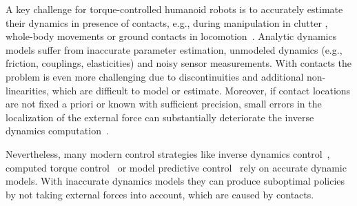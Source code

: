 
A key challenge for torque-controlled humanoid robots is to accurately
estimate their dynamics in presence of contacts, e.g.,
during manipulation in clutter
\cite{Jain2013clutter}, whole-body movements
\cite{Handbook2008legged} or ground contacts in locomotion~\cite{Calandra2014}.
Analytic dynamics models suffer from inaccurate parameter estimation, unmodeled dynamics (e.g., friction, couplings, elasticities) and noisy sensor measurements.
With contacts the problem is even more challenging due to discontinuities and additional non-linearities, which are difficult to model or estimate.
Moreover, if contact locations are not fixed a priori or known with sufficient precision, small errors in the localization of the external force can substantially deteriorate the inverse dynamics computation~\cite{DelPrete2012}.

Nevertheless, many modern control strategies like inverse dynamics control~\cite{Erez2012}, computed torque control~\cite{Siciliano2009} or model predictive control~\cite{Naveau2014} rely on accurate 
dynamic models.
With inaccurate dynamics models they can produce suboptimal policies by not taking external forces  into account, which are caused by contacts.


